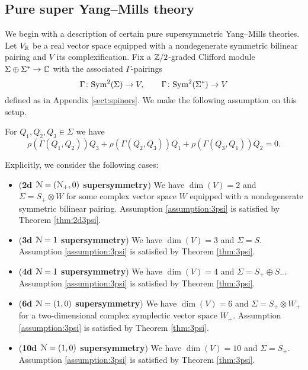 \documentclass[10pt, oneside]{article}
\begin{document}
\subsection{Pure super Yang--Mills theory}
\label{sect:gaugemultipletSUSY}

We begin with a description of certain pure supersymmetric Yang--Mills theories. Let $V_\mathbb R$ be a real vector space equipped with a nondegenerate symmetric bilinear pairing and $V$ its complexification. Fix a $\mathbb Z/2$-graded Clifford module $\Sigma\oplus \Sigma^*\rightarrow \mathbb C$ with the associated $\Gamma$-pairings
\[\Gamma\colon {\rm Sym}^2(\Sigma)\rightarrow V,\qquad \Gamma\colon {\rm Sym}^2(\Sigma^*)\rightarrow V\]
defined as in Appendix \ref{sect:spinors}. We make the following assumption on this setup.

\begin{assumption}
For $Q_1, Q_2, Q_3\in\Sigma$ we have
\[\rho(\Gamma(Q_1, Q_2))Q_3 + \rho(\Gamma(Q_2, Q_3))Q_1 + \rho(\Gamma(Q_3, Q_1))Q_2 = 0.\]
\label{assumption:3psi}
\end{assumption}

Explicitly, we consider the following cases:
\begin{itemize}
\item (\textbf{2d $\mathcal N=(\mathcal N_+, 0)$ supersymmetry}) We have $\dim(V) = 2$ and $\Sigma = S_+\otimes W$ for some complex vector space $W$ equipped with a nondegenerate symmetric bilinear pairing. Assumption \ref{assumption:3psi} is satisfied by Theorem \ref{thm:2d3psi}.

\item (\textbf{3d $\mathcal N=1$ supersymmetry}) We have $\dim(V) = 3$ and $\Sigma = S$. Assumption \ref{assumption:3psi} is satisfied by Theorem \ref{thm:3psi}.

\item (\textbf{4d $\mathcal N=1$ supersymmetry}) We have $\dim(V) = 4$ and $\Sigma = S_+\oplus S_-$. Assumption \ref{assumption:3psi} is satisfied by Theorem \ref{thm:3psi}.

\item (\textbf{6d $\mathcal N=(1, 0)$ supersymmetry}) We have $\dim(V) = 6$ and $\Sigma = S_+\otimes W_+$ for a two-dimensional complex symplectic vector space $W_+$. Assumption \ref{assumption:3psi} is satisfied by Theorem \ref{thm:3psi}.

\item (\textbf{10d $\mathcal N=(1, 0)$ supersymmetry}) We have $\dim(V) = 10$ and $\Sigma = S_+$. Assumption \ref{assumption:3psi} is satisfied by Theorem \ref{thm:3psi}.
\end{itemize}
\end{document}
